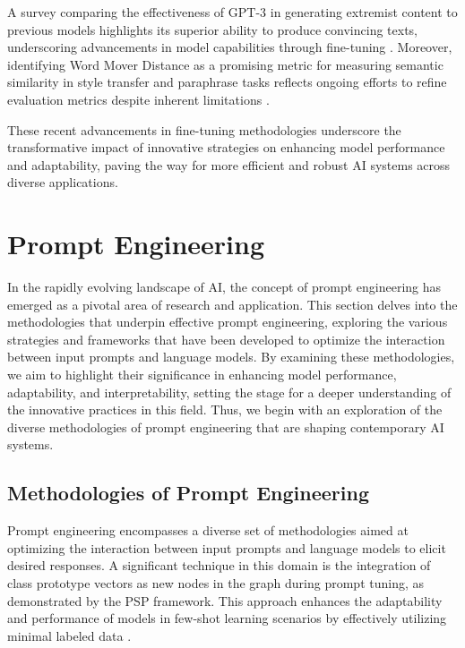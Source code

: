 A survey comparing the effectiveness of GPT-3 in generating extremist content to previous models highlights its superior ability to produce convincing texts, underscoring advancements in model capabilities through fine-tuning \cite{mcguffie2020radicalizationrisksgpt3advanced}. Moreover, identifying Word Mover Distance as a promising metric for measuring semantic similarity in style transfer and paraphrase tasks reflects ongoing efforts to refine evaluation metrics despite inherent limitations \cite{yamshchikov2020styletransferparaphraselookingsensible}.

These recent advancements in fine-tuning methodologies underscore the transformative impact of innovative strategies on enhancing model performance and adaptability, paving the way for more efficient and robust AI systems across diverse applications.












\section{Prompt Engineering} \label{sec:Prompt Engineering}

In the rapidly evolving landscape of AI, the concept of prompt engineering has emerged as a pivotal area of research and application. This section delves into the methodologies that underpin effective prompt engineering, exploring the various strategies and frameworks that have been developed to optimize the interaction between input prompts and language models. By examining these methodologies, we aim to highlight their significance in enhancing model performance, adaptability, and interpretability, setting the stage for a deeper understanding of the innovative practices in this field. Thus, we begin with an exploration of the diverse methodologies of prompt engineering that are shaping contemporary AI systems.






\subsection{Methodologies of Prompt Engineering} \label{subsec:Methodologies of Prompt Engineering}

Prompt engineering encompasses a diverse set of methodologies aimed at optimizing the interaction between input prompts and language models to elicit desired responses. A significant technique in this domain is the integration of class prototype vectors as new nodes in the graph during prompt tuning, as demonstrated by the PSP framework. This approach enhances the adaptability and performance of models in few-shot learning scenarios by effectively utilizing minimal labeled data \cite{ge2024psppretrainingstructureprompt}.

